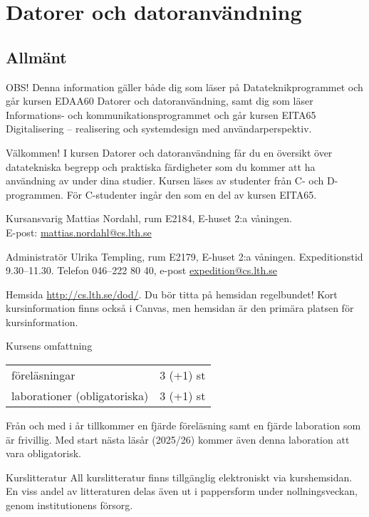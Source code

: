 \documentclass[a4paper]{memoir}
\begin{document}
\chapter*{Datorer och datoranvändning}

\section*{Allmänt}

\begin{Items}
    \item{}
    OBS! Denna information gäller både dig som läser på Datateknikprogrammet och går kursen EDAA60 Datorer och datoranvändning,
    samt dig som läser Informations- och kommunikationsprogrammet och går kursen EITA65 Digitalisering -- realisering och systemdesign med användarperspektiv.

    \item[Välkommen!]
    I kursen Datorer och datoranvändning får du en översikt över datatekniska begrepp och praktiska färdigheter som du kommer att ha användning av under dina studier. Kursen läses av studenter från C- och D-programmen. För C-studenter ingår den som en del av kursen EITA65.

    \item[Kursansvarig]
    Mattias Nordahl, rum E2184, E-huset 2:a våningen.\\
    E-post: \url{mattias.nordahl@cs.lth.se}

    \item[Administratör]
    Ulrika Templing, rum E2179, E-huset 2:a våningen. Expeditionstid 9.30--11.30. Telefon 046--222 80 40, e-post \url{expedition@cs.lth.se}

    \item[Hemsida]
    \url{http://cs.lth.se/dod/}. Du bör titta på hemsidan regelbundet! Kort kursinformation finns också i Canvas, men hemsidan är den primära platsen för kursinformation.

    \item[Kursens omfattning]
    \begin{tabular}[t]{@{}ll}
        föreläsningar                & 3 (+1) st \\
        laborationer (obligatoriska) & 3 (+1) st \\
    \end{tabular}

    Från och med i år tillkommer en fjärde föreläsning samt en fjärde laboration som är frivillig. Med start nästa läsår (2025/26) kommer även denna laboration att vara obligatorisk.

    \item[Kurslitteratur]
    All kurslitteratur finns tillgänglig elektroniskt via kurshemsidan. En viss andel av litteraturen delas även ut i pappersform under nollningsveckan, genom institutionens försorg.
\end{Items}
\end{document}
